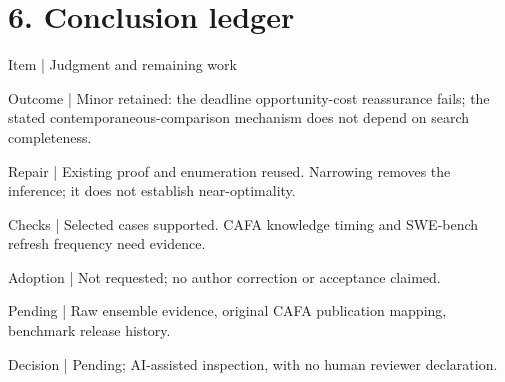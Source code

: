 \documentclass[10pt]{article}
\begin{document}
\section*{6. Conclusion ledger}
Item | Judgment and remaining work\par
Outcome | Minor retained: the deadline opportunity-cost reassurance fails; the stated contemporaneous-comparison mechanism does not depend on search completeness.\par
Repair | Existing proof and enumeration reused. Narrowing removes the inference; it does not establish near-optimality.\par
Checks | Selected cases supported. CAFA knowledge timing and SWE-bench refresh frequency need evidence.\par
Adoption | Not requested; no author correction or acceptance claimed.\par
Pending | Raw ensemble evidence, original CAFA publication mapping, benchmark release history.\par
Decision | Pending; AI-assisted inspection, with no human reviewer declaration.\par
\end{document}
